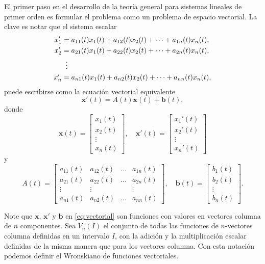 \begin{remark}
El primer paso en el desarrollo de la teor\'ia general para sistemas lineales de primer orden es formular el problema como un problema de espacio vectorial. La clave es notar que el sistema escalar
\begin{align}
    x_1' &= a_{11}(t)x_1(t) + a_{12}(t)x_2(t) + \dots + a_{1n}(t)x_n(t), \notag \\
    x_2' &= a_{21}(t)x_1(t) + a_{22}(t)x_2(t) + \dots + a_{2n}(t)x_n(t), \notag \\
    &\;\;\vdots \notag \\
    x_n' &= a_{n1}(t)x_1(t) + a_{n2}(t)x_2(t) + \dots + a_{nn}(t)x_n(t), \notag
\end{align}
puede escribirse como la ecuaci\'on vectorial equivalente
\begin{equation}\label{eq:vectorial}
    \boxed{\mathbf{x}'(t) = A(t)\mathbf{x}(t) + \mathbf{b}(t),}
\end{equation}
donde
\[
\mathbf{x}(t) = \begin{bmatrix} x_1(t) \\ x_2(t) \\ \vdots \\ x_n(t) \end{bmatrix}, \quad
\mathbf{x}'(t) = \begin{bmatrix} x_1'(t) \\ x_2'(t) \\ \vdots \\ x_n'(t) \end{bmatrix}
\]
y
\[
A(t) = \begin{bmatrix}
a_{11}(t) & a_{12}(t) & \dots & a_{1n}(t) \\
a_{21}(t) & a_{22}(t) & \dots & a_{2n}(t) \\
\vdots & \vdots & & \vdots \\
a_{n1}(t) & a_{n2}(t) & \dots & a_{nn}(t)
\end{bmatrix}, \quad
\mathbf{b}(t) = \begin{bmatrix} b_1(t) \\ b_2(t) \\ \vdots \\ b_n(t) \end{bmatrix}.
\]
\end{remark}

Note que $\mathbf{x}$, $\mathbf{x}'$ y $\mathbf{b}$ en \eqref{eq:vectorial} son funciones con valores en vectores columna de $n$ componentes. Sea $V_n(I)$ el conjunto de todas las funciones de $n$-vectores columna definidas en un intervalo $I$, con la adici\'on y la multiplicaci\'on escalar definidas de la misma manera que para los vectores columna. Con esta notaci\'on podemos definir el Wronskiano de funciones vectoriales.

